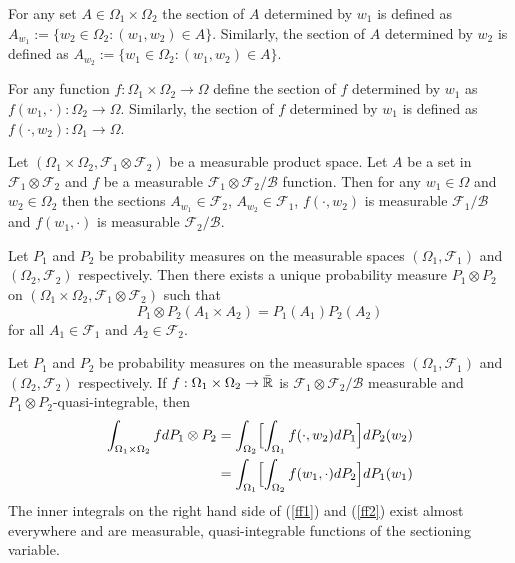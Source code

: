 \begin{definition}
For any set $A\in \Omega_1\times \Omega_2$ the section of $A$ determined by $w_1$ is defined as $A_{w_1}:=\{ w_2\in\Omega_2: (w_1,w_2)\in A \}$.
Similarly, the section of $A$ determined by $w_2$ is defined  as $A_{w_2}:=\{ w_1\in\Omega_2: (w_1,w_2)\in A \}$.
\end{definition}


\begin{definition}
For any function $f\colon\Omega_1\times \Omega_2\rightarrow \Omega$ define the section of $f$ determined by $w_1$ as $f(w_1, \cdot):\Omega_2\rightarrow \Omega$.
Similarly, the  section of $f$ determined by $w_1$ is defined as $f(\cdot, w_2):\Omega_1\rightarrow \Omega$.
\end{definition}


\begin{theorem}
\label{thm: sections are measurable}
Let $(\Omega_1\times \Omega_2,\mathcal F_1\otimes \mathcal F_2 )$ be a measurable product space. Let $A$ be a set in $\mathcal F_1\otimes \mathcal F_2$ and $f$ be a measurable $\mathcal F_1\otimes \mathcal F_2/\mathcal B$ function. Then for any $w_1\in\Omega$ and  $w_2\in\Omega_2$  then the sections $A_{w_1}\in\mathcal F_2$, $A_{w_2}\in\mathcal F_1$, $f(\cdot, w_2)$ is measurable $\mathcal F_1/\mathcal B$ and $f(w_1,\cdot)$ is measurable $\mathcal F_2/\mathcal B$.
\end{theorem}


\begin{theorem}
Let $P_1$ and $P_2$ be probability measures on the measurable spaces $(\Omega_1,\mathcal F_1)$ and $(\Omega_2,\mathcal F_2)$ respectively. Then there exists a unique probability measure $P_1\otimes P_2$ on $(\Omega_1\times \Omega_2,\mathcal F_1\otimes \mathcal F_2 )$ such that
\[ P_1\otimes P_2(A_1\times A_2)= P_1(A_1)P_2(A_2) \]
 for all $A_1\in\mathcal F_1$ and $A_2\in \mathcal F_2$.
\end{theorem}

\begin{theorem}[{\bf Fubinito}] \label{fubinito}
Let $P_1$ and $P_2$ be probability measures on the measurable spaces $(\Omega_1,\mathcal F_1)$ and $(\Omega_2,\mathcal F_2)$ respectively. If $f:\Omega_1\times\Omega_2\rightarrow \bar{\Bbb R}$ is $\mathcal F_1\otimes \mathcal F_2/\mathcal B$ measurable and $P_1\otimes P_2$-quasi-integrable, then
 \begin{align}
 \label{ff1}
   \int_{\Omega_1\times\Omega_2} f dP_1\otimes P_2 &=\int_{\Omega_2}\Bigl[ \int_{\Omega_1} f(\cdot,w_2) dP_1 \Bigr] dP_2(w_2)\\
   &=   \int_{\Omega_1}\Bigl[ \int_{\Omega_2} f(w_1,\cdot) dP_2 \Bigr] dP_1(w_1) \label{ff2}
  \end{align}
The inner integrals on the right hand side of (\ref{ff1}) and (\ref{ff2}) exist almost everywhere and are measurable, quasi-integrable functions of the sectioning variable.
\end{theorem}


